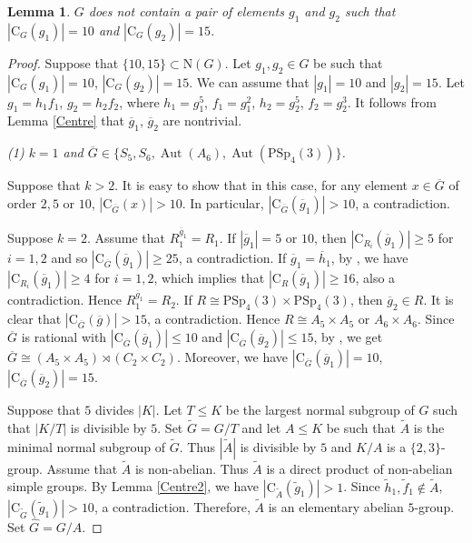 \documentclass[11pt]{article}
\providecommand{\PSp}{{\mathrm{PSp}}}
\providecommand{\N}{{\mathrm{N}}}
\providecommand{\C}{{\mathrm{C}}}
\providecommand{\Aut}{{\operatorname{Aut}}}
\providecommand{\olg}{{\overline{g}}}
\providecommand{\olG}{{\overline{G}}}
\providecommand{\wtf}{{\widetilde{f}}}
\providecommand{\wth}{{\widetilde{h}}}
\providecommand{\wtA}{{\widetilde{A}}}
\providecommand{\wtG}{{\widetilde{G}}}
\providecommand{\whG}{{\widehat{G}}}
\newtheorem{lem}{Lemma}
\begin{document}
\begin{lem}
    $G$ does not contain a pair of elements $g_1$ and $g_2$ such that $|\C_G(g_1)|=10$ and $|\C_G(g_2)|=15$.
\end{lem}

\begin{proof}
    Suppose that $\{10,15\}\subset \N(G)$. 
    Let $g_1,g_2\in G$ be such that $|\C_G(g_1)|=10$, $|\C_G(g_2)|=15$. 
    We can assume that $|g_1|=10$ and $|g_2|=15$. 
    Let $g_1=h_1 f_1$, $g_2=h_2 f_2$, where $h_1=g_1^5$, $f_1 = g_1^2$, $h_2 = g_2 ^5$, $f_2= g_2^3$.
    It follows from Lemma \ref{Centre} that $\overline g_1$, $\overline g_2$ are nontrivial. 

{\sl  (1) $k=1$ and $\olG\in\{S_5, S_6, \Aut(A_6), \Aut(\PSp_4(3))\}$. } 
    
    Suppose that $k>2$. 
    It is easy to show that 
    in this case,  for any element $x\in \overline{G}$ of order $2, 5$ or $10$,
    $|\C_{\overline{G}}(x)|>10$.
    In particular, $|\C_{\overline G}(\overline g_1)|>10$, a contradiction.

    Suppose $k=2$.
    Assume that $R_1^{\overline g_1}=R_1$. 
    If $|\overline g_1|=5$ or $10$, then $|\C_{R_i}(\overline g_1)|\geq 5$ for $i=1,2$ 
    and so $|\C_{\olG}(\overline g_1)|\geq 25$, a contradiction.
    If $\overline g_1 =  \overline h_1$, 
    by \cite[Code 1]{Git}, we have $|\C_{R_i}(\overline g_1)|\geq 4$ for $i=1,2$,
    which implies that $|\C_R(\overline g_1)|\geq 16$, also a contradiction.
    Hence $R_1^{\overline g_1}=R_2$.
    If $R\cong \PSp_4(3)\times \PSp_4(3)$, then $\olg_2\in R$.
    It is clear that $|\C_{\olG}(\olg)|>15$, a contradiction.
    Hence $R\cong A_5\times A_5$ or $A_6\times A_6$.
    Since $\olG$ is rational with $|\C_{\olG}(\overline g_1)|\leq 10$ and $|\C_{\olG}(\overline g_2)|\leq 15$,
    by \cite[Code 3, Code 7]{Git}, we get $\overline G\cong (A_5\times A_5)\rtimes (C_2\times C_2)$.
    Moreover, we have $|\C_{\olG}(\overline g_1)|=10$, $|\C_{\overline{G}}(\overline g_2)|=15$.

    Suppose that $5$ divides $|K|$. 
    Let $T\leq K$ be the largest normal subgroup of $G$ such that $|K/T|$ is divisible by $5$. 
    Set $\wtG=G/T$ and let $A\leq K$ be such that $\wtA$ is the minimal normal subgroup of $\wtG$. 
    Thus $|\wtA|$ is divisible by $5$ and $K/A$ is a $\{2,3\}$-group. 
    Assume that $\wtA$ is non-abelian. Thus $\wtA$ is a direct product of non-abelian simple groups. 
    By Lemma \ref{Centre2}, we have $|\C_{\widetilde{A}}(\widetilde g_1)|>1$.
    Since $\wth_1, \wtf_1\notin \wtA$, 
    $|\C_{\widetilde{G}}(\widetilde g_1)|> 10$, a contradiction. 
    Therefore, $\wtA$ is an elementary abelian $5$-group. 
    Set $\whG=G/A$. 
    

\end{proof}
\end{document}
